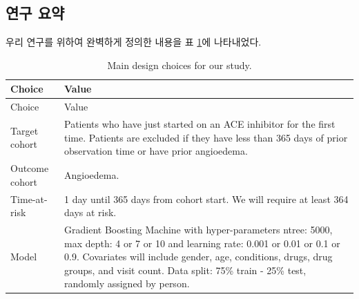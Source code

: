 \documentclass[11pt]{book}
\theoremstyle{definition}
\theoremstyle{definition}
\theoremstyle{definition}
\theoremstyle{remark}
\begin{document}
\subsection{연구 요약}\label{--1}

우리 연구를 위하여 완벽하게 정의한 내용을 표 \ref{tab:plpSummary}에
나타내었다.

\begin{longtable}[]{@{}ll@{}}
\caption{\label{tab:plpSummary} Main design choices for our
study.}\tabularnewline
\toprule
\begin{minipage}[b]{0.23\columnwidth}\raggedright\strut
Choice\strut
\end{minipage} & \begin{minipage}[b]{0.71\columnwidth}\raggedright\strut
Value\strut
\end{minipage}\tabularnewline
\midrule
\endfirsthead
\toprule
\begin{minipage}[b]{0.23\columnwidth}\raggedright\strut
Choice\strut
\end{minipage} & \begin{minipage}[b]{0.71\columnwidth}\raggedright\strut
Value\strut
\end{minipage}\tabularnewline
\midrule
\endhead
\begin{minipage}[t]{0.23\columnwidth}\raggedright\strut
Target cohort\strut
\end{minipage} & \begin{minipage}[t]{0.71\columnwidth}\raggedright\strut
Patients who have just started on an ACE inhibitor for the first time.
Patients are excluded if they have less than 365 days of prior
observation time or have prior angioedema.\strut
\end{minipage}\tabularnewline
\begin{minipage}[t]{0.23\columnwidth}\raggedright\strut
Outcome cohort\strut
\end{minipage} & \begin{minipage}[t]{0.71\columnwidth}\raggedright\strut
Angioedema.\strut
\end{minipage}\tabularnewline
\begin{minipage}[t]{0.23\columnwidth}\raggedright\strut
Time-at-risk\strut
\end{minipage} & \begin{minipage}[t]{0.71\columnwidth}\raggedright\strut
1 day until 365 days from cohort start. We will require at least 364
days at risk.\strut
\end{minipage}\tabularnewline
\begin{minipage}[t]{0.23\columnwidth}\raggedright\strut
Model\strut
\end{minipage} & \begin{minipage}[t]{0.71\columnwidth}\raggedright\strut
Gradient Boosting Machine with hyper-parameters ntree: 5000, max depth:
4 or 7 or 10 and learning rate: 0.001 or 0.01 or 0.1 or 0.9. Covariates
will include gender, age, conditions, drugs, drug groups, and visit
count. Data split: 75\% train - 25\% test, randomly assigned by
person.\strut
\end{minipage}\tabularnewline
\bottomrule
\end{longtable}
\end{document}
